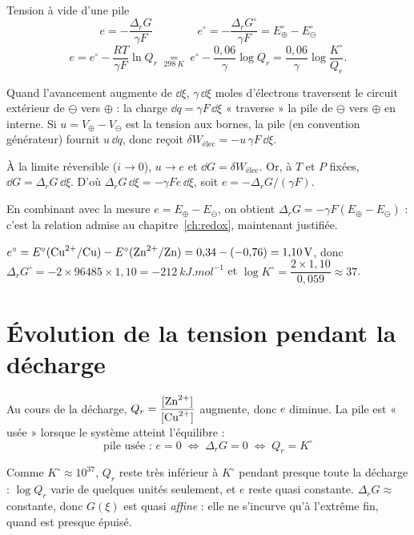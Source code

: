 \begin{resultat}{Tension à vide d'une pile}
\[ \boxed{e = -\frac{\Delta_rG}{\gamma F}} \qquad\qquad \boxed{e^\circ = -\frac{\Delta_rG^\circ}{\gamma F} = E^\circ_\oplus - E^\circ_\ominus} \]
\[ e = e^\circ - \frac{RT}{\gamma F}\ln Q_r \;\underset{\SI{298}{K}}{=}\; e^\circ - \frac{0{,}06}{\gamma}\log Q_r = \frac{0{,}06}{\gamma}\log\frac{K^\circ}{Q_r}. \]
\end{resultat}

\begin{demo}
Quand l'avancement augmente de $\dd\xi$, $\gamma\,\dd\xi$ moles d'électrons traversent le circuit extérieur de $\ominus$ vers $\oplus$ : la charge $\dd q = \gamma F\,\dd\xi$ « traverse » la pile de $\ominus$ vers $\oplus$ en interne. Si $u = V_\oplus - V_\ominus$ est la tension aux bornes, la pile (en convention générateur) fournit $u\,\dd q$, donc reçoit $\delta W_{\text{élec}} = -u\,\gamma F\,\dd\xi$.

\noindent À la limite réversible ($i \to 0$), $u \to e$ et $\dd G = \delta W_{\text{élec}}$. Or, à $T$ et $P$ fixées, $\dd G = \Delta_rG\,\dd\xi$. D'où $\Delta_rG\,\dd\xi = -\gamma F e\,\dd\xi$, soit $e = -\Delta_rG/(\gamma F)$.
\end{demo}

En combinant avec la mesure $e = E_\oplus - E_\ominus$, on obtient $\Delta_rG = -\gamma F(E_\oplus - E_\ominus)$ : c'est la relation admise au chapitre~\ref{ch:redox}, maintenant justifiée.

\begin{exemple}
$e^\circ = E^\circ(\ce{Cu^{2+}/Cu}) - E^\circ(\ce{Zn^{2+}/Zn}) = 0{,}34 - (-0{,}76) = \SI{1,10}{V}$, donc $\Delta_rG^\circ = -2\times96485\times1{,}10 = \SI{-212}{kJ.mol^{-1}}$ et $\log K^\circ = \dfrac{2\times1{,}10}{0{,}059} \approx 37$.
\end{exemple}

\section{Évolution de la tension pendant la décharge}

Au cours de la décharge, $Q_r = \dfrac{[\ce{Zn^{2+}}]}{[\ce{Cu^{2+}}]}$ augmente, donc $e$ diminue. La pile est « usée » lorsque le système atteint l'équilibre :
\[ \boxed{\text{pile usée : } e = 0 \;\Longleftrightarrow\; \Delta_rG = 0 \;\Longleftrightarrow\; Q_r = K^\circ} \]

Comme $K^\circ \approx 10^{37}$, $Q_r$ reste très inférieur à $K^\circ$ pendant presque toute la décharge : $\log Q_r$ varie de quelques unités seulement, et $e$ reste quasi constante. $\Delta_rG \approx$ constante, donc $G(\xi)$ est quasi \emph{affine} : elle ne s'incurve qu'à l'extrême fin, quand  est presque épuisé.

